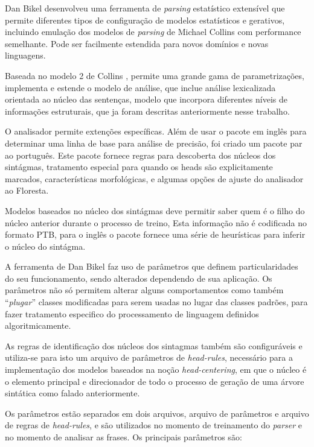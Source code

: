 Dan Bikel desenvolveu uma ferramenta de \emph{parsing} estatístico extensível que permite diferentes tipos de configuração de modelos estatísticos e gerativos, incluindo emulação dos modelos de \emph{parsing} de Michael Collins com performance semelhante. Pode ser facilmente estendida para novos domínios e novas linguagens. 

Baseada no modelo 2 de Collins \cite{collins99}, permite uma grande gama de parametrizações, implementa e estende o modelo de análise, que inclue análise lexicalizada orientada ao núcleo das sentenças, modelo que incorpora diferentes níveis de informações estruturais, que ja foram descritas anteriormente nesse trabalho. 

O analisador permite extenções específicas. Além de usar o pacote em inglês para determinar uma linha de base para análise de precisão, foi criado um pacote par ao português. Este pacote fornece regras para descoberta dos núcleos dos sintágmas, tratamento especial para quando os heads são explicitamente marcados, características morfológicas, e algumas opções de ajuste do analisador ao Floresta.

Modelos baseados no núcleo dos sintágmas deve permitir saber quem é o filho do núcleo anterior durante o processo de treino, Esta informação não é codificada no formato PTB, para o inglês o pacote fornece uma série de heurísticas para inferir o núcleo do sintágma.

A ferramenta de Dan Bikel faz uso de parâmetros que definem particularidades do seu funcionamento, sendo alterados dependendo de sua aplicação. Os parâmetros não só permitem alterar alguns comportamentos como também ``\emph{plugar}'' classes modificadas para serem usadas no lugar das classes padrões, para fazer tratamento especifico do processamento de linguagem definidos algoritmicamente.

As regras de identificação dos núcleos dos sintagmas também são configuráveis e utiliza-se para isto um arquivo de parâmetros de \emph{head-rules}, necessário para a implementação dos modelos baseados na noção \emph{head-centering}, em que o núcleo é o elemento principal e direcionador de todo o processo de geração de uma árvore sintática como falado anteriormente.

Os parâmetros estão separados em dois arquivos, arquivo de parâmetros e arquivo de regras de \emph{head-rules}, e são utilizados no momento de treinamento do \emph{parser} e no momento de analisar as frases. Os principais parâmetros são:

